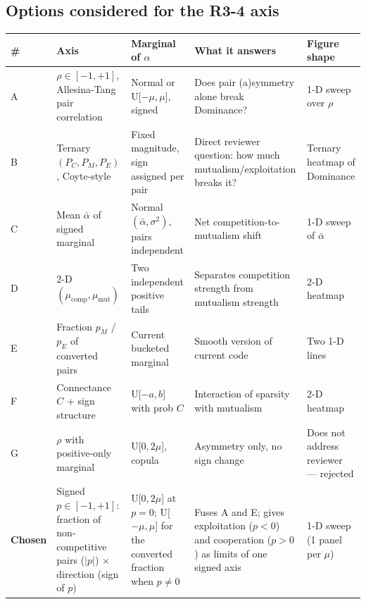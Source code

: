 \documentclass[11pt]{article}
\begin{document}
\subsection*{Options considered for the R3-4 axis}
\begin{center}
\small
\begin{tabular}{p{} p{} p{} p{} p{}}
\toprule
\# & \textbf{Axis} & \textbf{Marginal of $\alpha$} & \textbf{What it answers} & \textbf{Figure shape} \\
\midrule
A & $\rho \in [-1,+1]$, Allesina-Tang pair correlation & Normal or U[$-\mu,\mu$], signed & Does pair (a)symmetry alone break Dominance? & 1-D sweep over $\rho$ \\
B & Ternary $(P_C,P_M,P_E)$, Coyte-style & Fixed magnitude, sign assigned per pair & Direct reviewer question: how much mutualism/exploitation breaks it? & Ternary heatmap of Dominance \\
C & Mean $\bar\alpha$ of signed marginal & Normal$(\bar\alpha,\sigma^2)$, pairs independent & Net competition-to-mutualism shift & 1-D sweep of $\bar\alpha$ \\
D & 2-D $(\mu_{\mathrm{comp}}, \mu_{\mathrm{mut}})$ & Two independent positive tails & Separates competition strength from mutualism strength & 2-D heatmap \\
E & Fraction $p_M$ / $p_E$ of converted pairs & Current bucketed marginal & Smooth version of current code & Two 1-D lines \\
F & Connectance $C$ + sign structure & U[$-a,b$] with prob $C$ & Interaction of sparsity with mutualism & 2-D heatmap \\
G & $\rho$ with positive-only marginal & U[$0,2\mu$], copula & Asymmetry only, no sign change & Does not address reviewer --- rejected \\
\midrule
\textbf{Chosen} & Signed $p \in [-1,+1]$: fraction of non-competitive pairs ($|p|$) $\times$ direction (sign of $p$) & U[$0,2\mu$] at $p=0$; U[$-\mu,\mu$] for the converted fraction when $p \neq 0$ & Fuses A and E; gives exploitation ($p<0$) and cooperation ($p>0$) as limits of one signed axis & 1-D sweep (1 panel per $\mu$) \\
\bottomrule
\end{tabular}
\end{center}
\end{document}
